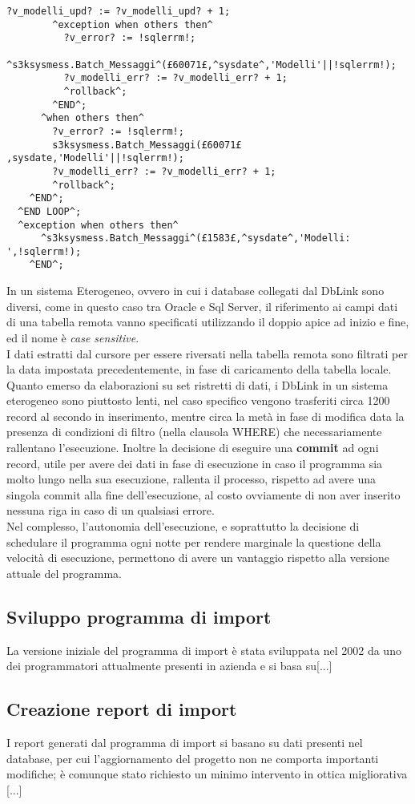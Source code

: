 \begin{lstlisting}[frame=single, style=base]
           ?v_modelli_upd? := ?v_modelli_upd? + 1;
        ^exception when others then^
          ?v_error? := !sqlerrm!;
          ^s3ksysmess.Batch_Messaggi^(£60071£,^sysdate^,'Modelli'||!sqlerrm!);
          ?v_modelli_err? := ?v_modelli_err? + 1;
          ^rollback^;
        ^END^;
      ^when others then^
        ?v_error? := !sqlerrm!;
        s3ksysmess.Batch_Messaggi(£60071£ ,sysdate,'Modelli'||!sqlerrm!);
        ?v_modelli_err? := ?v_modelli_err? + 1;
        ^rollback^;
    ^END^;
  ^END LOOP^;
  ^exception when others then^
      ^s3ksysmess.Batch_Messaggi^(£1583£,^sysdate^,'Modelli: ',!sqlerrm!);
    ^END^;
\end{lstlisting}
In un sistema Eterogeneo, ovvero in cui i database collegati dal DbLink sono diversi, come in questo caso tra Oracle e Sql Server, il riferimento ai campi dati di una tabella remota vanno specificati utilizzando il doppio apice ad inizio e fine, ed il nome è \textit{case sensitive}.\\
I dati estratti dal cursore per essere riversati nella tabella remota sono filtrati per la data impostata precedentemente, in fase di caricamento della tabella locale.
Quanto emerso da elaborazioni su set ristretti di dati, i DbLink in un sistema eterogeneo sono piuttosto lenti, nel caso specifico vengono trasferiti circa 1200 record al secondo in inserimento, mentre circa la metà in fase di modifica data la presenza di condizioni di filtro (nella clausola WHERE) che necessariamente rallentano l'esecuzione. Inoltre la decisione di eseguire una \textbf{commit} ad ogni record, utile per avere dei dati in fase di esecuzione in caso il programma sia molto lungo nella sua esecuzione, rallenta il processo, rispetto ad avere una singola commit alla fine dell'esecuzione, al costo ovviamente di non aver inserito nessuna riga in caso di un qualsiasi errore.\\
Nel complesso, l'autonomia dell'esecuzione, e soprattutto la decisione di schedulare il programma ogni notte per rendere marginale la questione della velocità di esecuzione, permettono di avere un vantaggio rispetto alla versione attuale del programma.
\subsection{Sviluppo programma di import}
La versione iniziale del programma di import è stata sviluppata nel 2002 da uno dei programmatori attualmente presenti in azienda e si basa su[...] \\


\subsection{Creazione report di import}
I report generati dal programma di import si basano su dati presenti nel database, per cui l'aggiornamento del progetto non ne comporta importanti modifiche; è comunque stato richiesto un minimo intervento in ottica migliorativa [...]\\